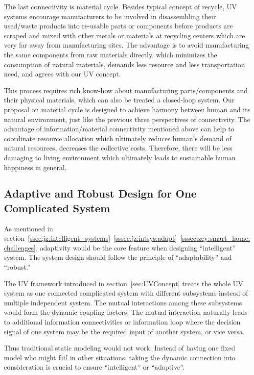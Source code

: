 \documentclass[letterpaper, twocolumn, 10pt, conference]{IEEEtran}
\begin{document}
The last connectivity is material cycle. Besides typical concept of recycle, UV systems encourage manufacturers to be involved in disassembling their used/waste products into re-usable parts or components before products are scraped and mixed with other metals or materials at recycling centers which are very far away from manufacturing sites. The advantage is to avoid manufacturing the same components from raw materials directly, which minimizes the consumption of natural materials, demands less resource and less transportation need, and agrees with our UV concept.   

This process requires rich know-how about manufacturing parts/components and their physical materials, which can also be treated a closed-loop system. Our proposal on material cycle is designed to achieve harmony between human and its natural environment, just like the previous three perspectives of connectivity. The advantage of information/material connectivity mentioned above can help to coordinate resource allocation which ultimately reduces human’s demand of natural resources, decreases the collective costs. Therefore, there will be less damaging to living environment which ultimately leads to sustainable human happiness in general. 

\subsection{Adaptive and Robust Design for One Complicated System}
\label{ssec:Adaptive.Design}

As mentioned in section~\ref{ssec:jz:intelligent_systems}~\ref{sssec:jz:intsys:adapt}~\ref{sssec:zcy:smart_home:challenges}, adaptivity would be the core feature when designing \enquote{intelligent} system. 
The system design should follow the principle of \enquote{adaptability} and \enquote{robust.} 

The UV framework introduced in section~\ref{sec:UVConcept} treats the whole UV system as one connected complicated system with different subsystems instead of multiple independent system. The mutual interactions among these subsystems would form the dynamic coupling factors.  The mutual interaction naturally leads to additional information connectivities or information loop where the decision signal of one system may be the required input of another system, or vice versa.

Thus traditional static modeling would not work. Instead of having one fixed model who might fail in other situations, taking the dynamic connection into consideration is crucial to ensure \enquote{intelligent} or \enquote{adaptive}. 
\end{document}
